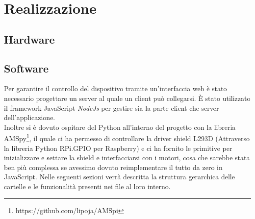 \documentclass[11pt]{article}
\begin{document}
\section{Realizzazione}
\subsection{Hardware} 
\subsection{Software}
Per garantire il controllo del dispositivo tramite un'interfaccia web è stato necessario progettare un server al quale un client può collegarsi. È stato utilizzato il framework JavaScript \textit{NodeJs} per gestire sia la parte client che server dell'applicazione.\\
Inoltre si è dovuto ospitare del Python all'interno del progetto con la libreria AMSpy\footnote{https://github.com/lipoja/AMSpi}, il quale ci ha permesso di controllare la driver shield L293D (Attraverso la libreria Python RPi.GPIO per Raspberry) e ci ha fornito le primitive per inizializzare e settare la shield e interfacciarsi con i motori, cosa che sarebbe stata ben più complessa se avessimo dovuto reimplementare il tutto da zero in JavaScript.
 Nelle seguenti sezioni verrà descritta la struttura gerarchica delle cartelle e le funzionalità presenti nei file al loro interno.
\end{document}
